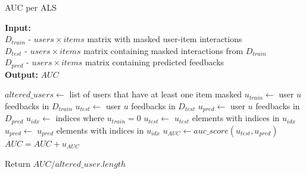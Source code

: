 \documentclass[12pt,italian]{report}
\begin{document}
\begin{algorithm}
\caption{AUC per ALS}
\label{alg:auc-als}
 \hspace*{\algorithmicindent}
  \textbf{Input:} \\
  \hspace*{\algorithmicindent}
  $D_{train}$ - $users \times items$ matrix with masked user-item interactions \\
  \hspace*{\algorithmicindent}
  $D_{test}$ - $users \times items$ matrix containing masked interactions from $D_{train}$ \\
  \hspace*{\algorithmicindent}
  $D_{pred}$ - $users \times items$ matrix containing predicted feedbacks \\
 \hspace*{\algorithmicindent} \textbf{Output:} $AUC$ \\ 
\begin{algorithmic}[1]

\STATE $altered\_users \leftarrow$ list of users that have at least one item masked
  \STATE $u_{train} \leftarrow$ user $u$ feedbacks in $D_{train}$
  \STATE $u_{test} \leftarrow$ user $u$ feedbacks in $D_{test}$
  \STATE $u_{pred} \leftarrow$ user $u$ feedbacks in $D_{pred}$
  \STATE $u_{idx} \leftarrow$ indices where $u_{train} = 0$
  \STATE $u_{test} \leftarrow$  $u_{test}$ elements with indices in $u_{idx}$
  \STATE $u_{pred} \leftarrow$  $u_{pred}$ elements with indices in $u_{idx}$
  \STATE $u_{AUC} \leftarrow auc\_score(u_{test}, u_{pred})$
  \STATE $AUC = AUC + u_{AUC}$ 
\ENDFOR

\STATE Return $AUC/altered\_user.length$

\end{algorithmic}
\end{algorithm}
\end{document}
